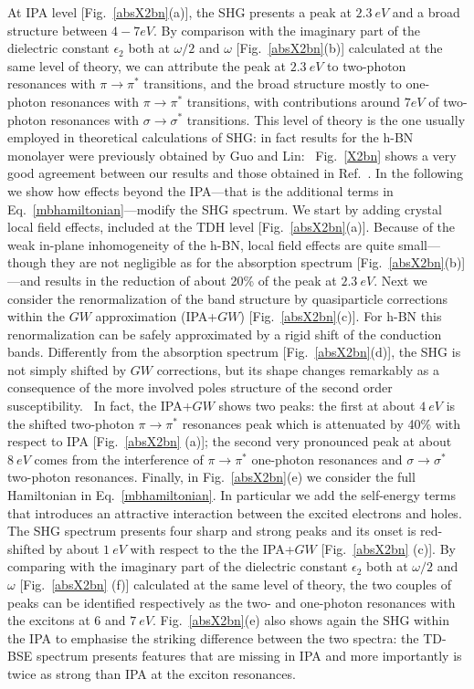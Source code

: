 At IPA level [Fig.~\ref{absX2bn}(a)], the SHG presents a peak at $2.3~eV$ and a broad structure between $4 - 7 eV$. By comparison with the imaginary part of the dielectric constant $\epsilon_2$ both at $\omega/2$ and  $\omega$ [Fig.~\ref{absX2bn}(b)] calculated at the same level of theory, we can attribute the peak at $2.3~eV$ to two-photon resonances with $\pi \to \pi^*$ transitions, and the broad structure mostly to one-photon resonances with $\pi \to \pi^*$ transitions, with contributions around $7 eV$ of two-photon resonances with $\sigma \to \sigma^*$ transitions.
This level of theory is the one usually employed in theoretical calculations of SHG: in fact results for the h-BN monolayer were previously obtained by Guo and Lin:~\cite{guo2005second} Fig.~\ref{X2bn} shows a very good agreement between our results and those obtained in Ref.~\cite{guo2005second}. In the following we show how effects beyond the IPA---that is the additional terms in Eq.~\eqref{mbhamiltonian}---modify the SHG spectrum.        
We start by adding crystal local field effects, included at the TDH level [Fig.~\ref{absX2bn}(a)]. Because of the weak in-plane inhomogeneity of the h-BN, local field effects are quite small---though they are not negligible as for the absorption spectrum  [Fig.~\ref{absX2bn}(b)]---and results in the reduction of about 20\% of the peak at $2.3~eV$. Next we consider the renormalization of the band structure by quasiparticle corrections within the $GW$ approximation (IPA+$GW$) [Fig.~\ref{absX2bn}(c)]. For h-BN this renormalization can be safely approximated by a rigid shift of the conduction bands. Differently from the absorption spectrum [Fig.~\ref{absX2bn}(d)], the SHG is not simply shifted by $GW$ corrections, but its shape changes remarkably as a consequence of the more involved poles structure of the second order susceptibility.~\cite{PhysRevB.82.235201,hughes1996calculation}
In fact, the IPA+$GW$ shows two peaks: the first at about $4~eV$ is the shifted two-photon $\pi \to \pi^*$  resonances peak which is attenuated by 40\% with respect to IPA  [Fig.~\ref{absX2bn} (a)]; the second very pronounced peak at about $8~eV$ comes from the interference of  $\pi \to \pi^*$  one-photon resonances and  $\sigma \to \sigma^*$ two-photon resonances.  
Finally, in Fig.~\ref{absX2bn}(e) we consider the full Hamiltonian in Eq.~\eqref{mbhamiltonian}. In particular we add the self-energy terms that introduces an attractive interaction between the excited electrons and holes\cite{strinati}. The SHG spectrum presents four sharp and strong peaks and its onset is red-shifted by about $1~eV$ with respect to the the IPA+$GW$ [Fig.~\ref{absX2bn} (c)]. By comparing with the imaginary part of the dielectric constant $\epsilon_2$ both at $\omega/2$ and  $\omega$ [Fig.~\ref{absX2bn} (f)] calculated at the same level of theory, the two couples of peaks can be identified respectively as the two- and one-photon resonances with the excitons at $6$ and $7~eV$.  Fig.~\ref{absX2bn}(e) also shows again the SHG within the IPA to emphasise the striking difference between the two spectra: the TD-BSE spectrum presents features that are missing in IPA and more importantly is twice as strong than IPA at the exciton resonances. 
